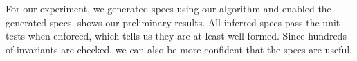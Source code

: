 \label{infer:sec:experiment3}

For our experiment, we generated specs using our algorithm and enabled
the generated specs.  shows
our preliminary results. All inferred specs pass the unit
tests when enforced, which tells us they are at least well formed.
Since hundreds of invariants are checked, we can also be more confident
that the specs are useful.




% 
% 
%
% 
